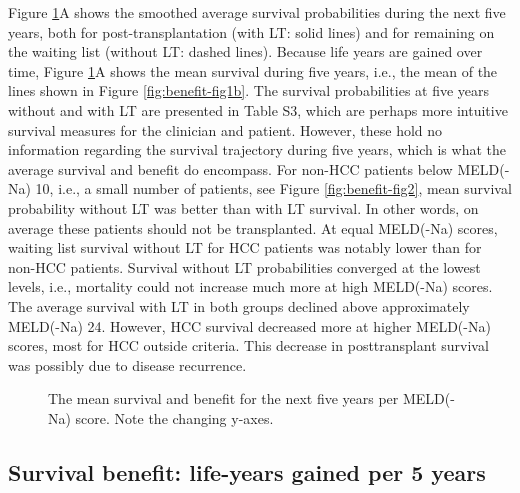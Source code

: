 \documentclass[11pt,english,]{book} %
\begin{document}
Figure \ref{fig:benefit-fig3a}A shows the smoothed average survival probabilities during the next five years, both for post-transplantation (with LT: solid lines) and for remaining on the waiting list (without LT: dashed lines). Because life years are gained over time, Figure \ref{fig:benefit-fig3a}A shows the mean survival during five years, i.e., the mean of the lines shown in Figure \ref{fig:benefit-fig1b}. The survival probabilities at five years without and with LT are presented in Table S3, which are perhaps more intuitive survival measures for the clinician and patient. However, these hold no information regarding the survival trajectory during five years, which is what the average survival and benefit do encompass.
For non-HCC patients below MELD(-Na) 10, i.e., a small number of patients, see Figure \ref{fig:benefit-fig2}, mean survival probability without LT was better than with LT survival. In other words, on average these patients should not be transplanted. At equal MELD(-Na) scores, waiting list survival without LT for HCC patients was notably lower than for non-HCC patients. Survival without LT probabilities converged at the lowest levels, i.e., mortality could not increase much more at high MELD(-Na) scores. The average survival with LT in both groups declined above approximately MELD(-Na) 24. However, HCC survival decreased more at higher MELD(-Na) scores, most for HCC outside criteria. This decrease in posttransplant survival was possibly due to disease recurrence.

\begin{figure}
\newline{}\caption{The mean survival and benefit for the next five years per MELD(-Na) score. Note the changing y-axes.}\label{fig:benefit-fig3a}
\end{figure}

\hypertarget{survival-benefit-life-years-gained-per-5-years}{%
\subsection*{Survival benefit: life-years gained per 5 years}\label{survival-benefit-life-years-gained-per-5-years}}
\end{document}
